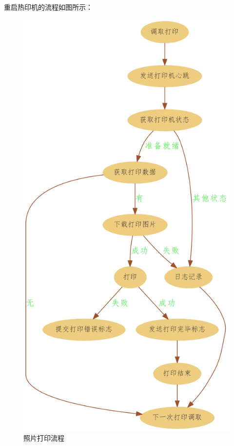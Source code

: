 \documentclass{book}
\begin{document}
重启热印机的流程如图所示：

\begin{figure}[htbp]
	\centering
	\includegraphics[scale=0.2]{PhotoPrintWorkflowOptimized.jpg}
	\caption{照片打印流程}
	\label{fig:RestartMachine}
\end{figure}
\end{document}
